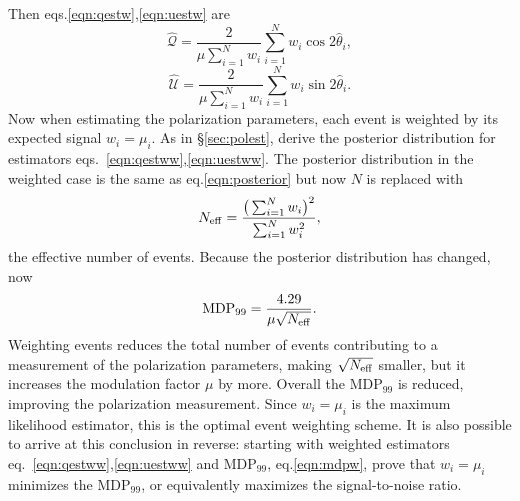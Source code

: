Then eqs.\ref{eqn:qestw},\ref{eqn:uestw} are 
\begin{equation}
    \hat{\mathcal{Q}} = \frac{2}{\mu\sum^N_{i=1}w_i} \sum^N_{i=1}w_i\cos2\hat{\theta}_i,
    \label{eqn:qestww}
\end{equation}
\begin{equation}
    \hat{\mathcal{U}} = \frac{2}{\mu\sum^N_{i=1}w_i} \sum^N_{i=1}w_i\sin2\hat{\theta}_i.
    \label{eqn:uestww}
\end{equation}
Now when estimating the polarization parameters, each event is weighted by its expected signal $w_i = \mu_i$. As in \S\ref{sec:polest}, \citet{kislat_analyzing_2015} derive the posterior distribution for estimators eqs.~\ref{eqn:qestww},\ref{eqn:uestww}. The posterior distribution in the weighted case is the same as eq.\ref{eqn:posterior} but now $N$ is replaced with
\begin{equation}
N_{\rm eff} = \frac{\big(\sum_{i=1}^N w_i\big)^2}{\sum_{i=1}^N w_i^2},
\end{equation}
the effective number of events. Because the posterior distribution has changed, now
\begin{equation}
    \label{eqn:mdpw}
    {\rm MDP}_{99} = \frac{4.29}{\mu \sqrt{N_{\rm eff}}}.
\end{equation}
Weighting events reduces the total number of events contributing to a measurement of the polarization parameters, making $\sqrt{N_{\rm eff}}$ smaller, but it increases the modulation factor $\mu$ by more. Overall the MDP$_{99}$ is reduced, improving the polarization measurement. Since $w_i = \mu_i$ is the maximum likelihood estimator, this is the optimal event weighting scheme. It is also possible to arrive at this conclusion in reverse: starting with weighted estimators eq.~\ref{eqn:qestww},\ref{eqn:uestww} and MDP$_{99}$, eq.\ref{eqn:mdpw}, \citet{peirson_towards_2021} prove that $w_i = \mu_i$ minimizes the MDP$_{99}$, or equivalently maximizes the signal-to-noise ratio. 

